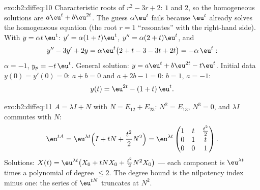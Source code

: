 \begin{solution}{exo:b2:diffeq:10}
Characteristic roots of $r^2 - 3r + 2$: $1$ and $2$, so the
homogeneous solutions are $a\eu^t + b\eu^{2t}$. The guess
$\alpha\eu^t$ fails because $\eu^t$ already solves the
homogeneous equation (the root $r = 1$ ``resonates'' with the
right-hand side). With $y = \alpha t\,\eu^t$: $y' = \alpha(1 +
t)\eu^t$, $y'' = \alpha(2 + t)\eu^t$, and
\[
y'' - 3y' + 2y = \alpha\eu^t\bigl(2 + t - 3 - 3t + 2t\bigr)
= -\alpha\,\eu^t :
\]
$\alpha = -1$, $y_p = -t\,\eu^t$. General solution: $y = a\eu^t
+ b\eu^{2t} - t\eu^t$. Initial data $y(0) = y'(0) = 0$: $a + b
= 0$ and $a + 2b - 1 = 0$: $b = 1$, $a = -1$:
\[
y(t) = \eu^{2t} - (1 + t)\,\eu^{t} .
\]

\end{solution}

\begin{solution}{exo:b2:diffeq:11}
$A = \lambda I + N$ with $N = E_{12} + E_{23}$: $N^2 = E_{13}$,
$N^3 = 0$, and $\lambda I$ commutes with $N$:
\[
\eu^{tA} = \eu^{\lambda t}\Bigl(I + tN +
\frac{t^2}{2}N^2\Bigr)
= \eu^{\lambda t}\begin{pmatrix}
1 & t & \frac{t^2}{2}\\
0 & 1 & t\\
0 & 0 & 1
\end{pmatrix}.
\]
Solutions: $X(t) = \eu^{\lambda t}\bigl(X_0 + tNX_0 +
\frac{t^2}2N^2X_0\bigr)$ --- each component is $\eu^{\lambda
t}$ times a polynomial of degree $\leq 2$. The degree bound is
the nilpotency index minus one: the series of $\eu^{tN}$
truncates at $N^2$.
\end{solution}

